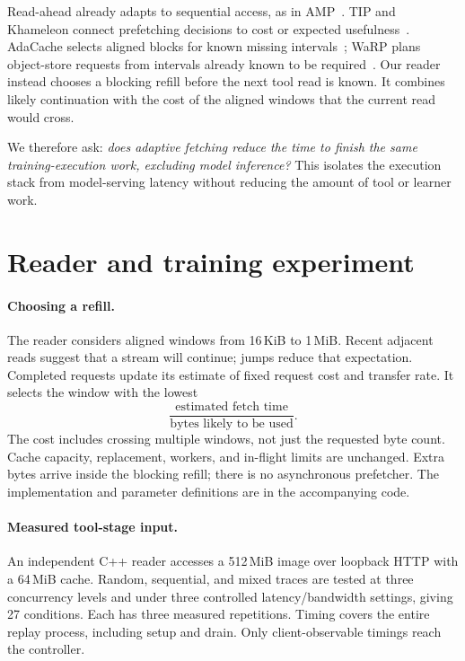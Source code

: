 \documentclass[10pt,twocolumn]{article}
\begin{document}
Read-ahead already adapts to sequential access, as in AMP~\cite{amp2007}.
TIP and Khameleon connect prefetching decisions to cost or expected
usefulness~\cite{tip1995,khameleon2020}. AdaCache selects aligned blocks
for known missing intervals~\cite{adacache2023}; WaRP plans object-store
requests from intervals already known to be required~\cite{warp2026}.
Our reader instead chooses a blocking refill before the next tool read
is known. It combines likely continuation with the cost of the aligned
windows that the current read would cross.

We therefore ask: \emph{does adaptive fetching reduce the time to finish
the same training-execution work, excluding model inference?}
This isolates the execution stack from model-serving latency without
reducing the amount of tool or learner work.



\section{Reader and training experiment}
\paragraph{Choosing a refill.}
The reader considers aligned windows from 16\,KiB to 1\,MiB. Recent
adjacent reads suggest that a stream will continue; jumps reduce that
expectation. Completed requests update its estimate of fixed request
cost and transfer rate. It selects the window with the lowest
\[
  \frac{\text{estimated fetch time}}{\text{bytes likely to be used}}.
\]
The cost includes crossing multiple windows, not just the requested
byte count. Cache capacity, replacement, workers, and in-flight limits
are unchanged. Extra bytes arrive inside the blocking refill; there is
no asynchronous prefetcher. The implementation and parameter definitions
are in the accompanying code.

\paragraph{Measured tool-stage input.}
An independent C++ reader accesses a 512\,MiB image over loopback HTTP
with a 64\,MiB cache. Random, sequential, and mixed traces are tested at three
concurrency levels and under three controlled latency/bandwidth settings, giving
27 conditions. Each has three measured repetitions. Timing covers the
entire replay process, including setup and drain. Only client-observable
timings reach the controller.
\end{document}
